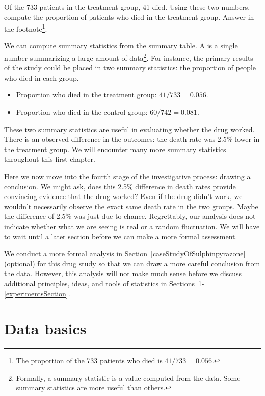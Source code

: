 \begin{exercise}
Of the 733 patients in the treatment group, 41 died. Using these two numbers, compute the proportion of patients who died in the treatment group. Answer in the footnote\footnote{The proportion of the 733 patients who died is $41/733 = 0.056$.}.
\end{exercise}

We can compute summary statistics from the summary table. A  is a single number summarizing a large amount of data\footnote{Formally, a summary statistic is a value computed from the data. Some summary statistics are more useful than others.}. For instance, the primary results of the study could be placed in two summary statistics: the proportion of people who died in each group.
\begin{itemize}
\setlength{\itemsep}{0mm}
\item[] Proportion who died in the treatment group: $41/733 = 0.056$.
\item[] Proportion who died in the control group: $60/742 = 0.081$.
\end{itemize}
These two summary statistics are useful in evaluating whether the drug worked. There is an observed difference in the outcomes: the death rate was 2.5\% lower in the treatment group. We will encounter many more summary statistics throughout this first chapter.

Here we now move into the fourth stage of the investigative process: drawing a conclusion. We might ask, does this 2.5\% difference in death rates provide convincing evidence that the drug worked? Even if the drug didn't work, we wouldn't necessarily observe the exact same death rate in the two groups. Maybe the difference of 2.5\% was just due to chance. Regrettably, our analysis does not indicate whether what we are seeing is real or a random fluctuation. We will have to wait until a later section before we can make a more formal assessment.

We conduct a more formal analysis in Section~\ref{caseStudyOfSulphinpyrazone} (optional) for this drug study so that we can draw a more careful conclusion from the data. However, this analysis will not make much sense before we discuss additional principles, ideas, and tools of statistics in Sections~\ref{dataBasics}-\ref{experimentsSection}. %

\section{Data basics}
\label{dataBasics}

